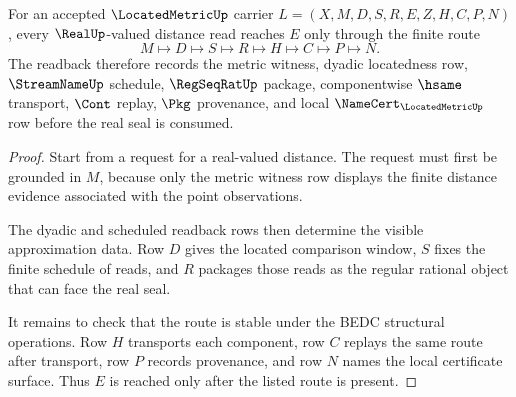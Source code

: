 \begin{theorem}
\label{thm:located-metric-real-seal-readback}
For an accepted $\LocatedMetricUp$ carrier $L=(X,M,D,S,R,E,Z,H,C,P,N)$, every $\RealUp$-valued distance read reaches $E$ only through the finite route
$$
M\longmapsto D\longmapsto S\longmapsto R\longmapsto H\longmapsto C\longmapsto P\longmapsto N.
$$
The readback therefore records the metric witness, dyadic locatedness row, $\StreamNameUp$ schedule, $\RegSeqRatUp$ package, componentwise $\hsame$ transport, $\Cont$ replay, $\Pkg$ provenance, and local $\NameCert_{\LocatedMetricUp}$ row before the real seal is consumed.
\end{theorem}
\begin{proof}
Start from a request for a real-valued distance. The request must first be grounded in $M$, because only the metric witness row displays the finite distance evidence associated with the point observations.

The dyadic and scheduled readback rows then determine the visible approximation data. Row $D$ gives the located comparison window, $S$ fixes the finite schedule of reads, and $R$ packages those reads as the regular rational object that can face the real seal.

It remains to check that the route is stable under the BEDC structural operations. Row $H$ transports each component, row $C$ replays the same route after transport, row $P$ records provenance, and row $N$ names the local certificate surface. Thus $E$ is reached only after the listed route is present.
\end{proof}



